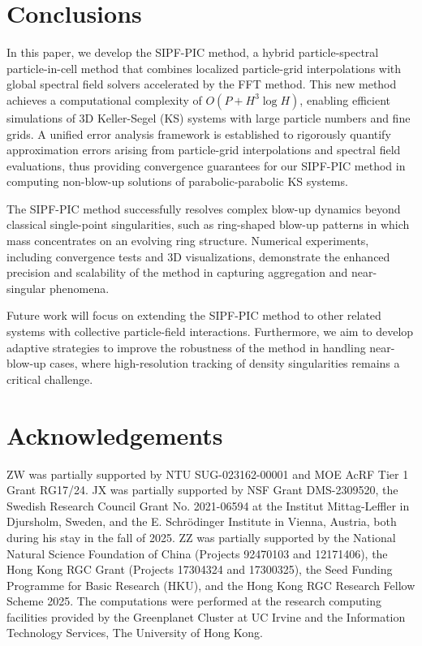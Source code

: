\documentclass[review,onefignum,onetabnum]{siamart250211}
\begin{document}
\section{Conclusions} \label{sec:conclusion}
In this paper, we develop the SIPF-PIC method, a hybrid particle-spectral particle-in-cell method that combines localized particle-grid interpolations with global spectral field solvers accelerated by the FFT method. 
This new method achieves a computational complexity of $O(P + H^3 \log H)$, enabling efficient simulations of 3D Keller-Segel (KS) systems with large particle numbers and fine grids. A unified error analysis framework is established to rigorously quantify approximation errors arising from particle-grid interpolations and spectral field evaluations, thus providing convergence guarantees for our SIPF-PIC method in computing non-blow-up solutions of parabolic-parabolic KS systems.

The SIPF-PIC method successfully resolves complex blow-up dynamics beyond classical single-point singularities, such as ring-shaped blow-up patterns in which mass concentrates on an evolving ring structure. Numerical experiments, including convergence tests and 3D visualizations, demonstrate the enhanced precision and scalability of the method in capturing aggregation and near-singular phenomena.  

Future work will focus on extending the SIPF-PIC method to other related systems with collective particle-field interactions. Furthermore, we aim to develop adaptive strategies to improve the robustness of the method in handling near-blow-up cases, where high-resolution tracking of density singularities remains a critical challenge.  


\section{Acknowledgements}
 \noindent  ZW was partially supported by NTU SUG-023162-00001 and MOE AcRF Tier 1 Grant RG17/24. JX was partially supported by NSF Grant DMS-2309520, the Swedish Research Council
Grant No. 2021-06594 at the Institut Mittag-Leffler in Djursholm, Sweden, and the E. Schrödinger Institute in Vienna, Austria, both during his stay in the fall of 2025. ZZ was partially supported by the National Natural Science Foundation of China (Projects 92470103 and 12171406), the Hong Kong RGC Grant (Projects 17304324 and 17300325), the Seed Funding Programme for Basic Research (HKU), and the Hong Kong RGC Research Fellow Scheme 2025. The computations were performed at the research computing facilities provided by the Greenplanet Cluster at UC Irvine and the Information Technology Services, The University of Hong Kong.



\printbibliography

%
%
\end{document}
